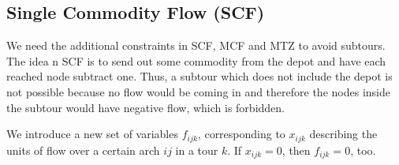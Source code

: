 \subsection{Single Commodity Flow (SCF)}

We need the additional constraints in SCF, MCF and MTZ to avoid subtours. The idea n SCF is
to send out some commodity from the depot and have each reached node subtract one. Thus, a 
subtour which does not include the depot is not possible because no flow would be coming in
and therefore the nodes inside the subtour would have negative flow, which is forbidden.

We introduce a new set of variables $f_{ijk}$, corresponding to $x_{ijk}$ describing the units
of flow over a certain arch $ij$ in a tour $k$. If $x_{ijk} = 0$, then $f_{ijk} = 0$, too.

